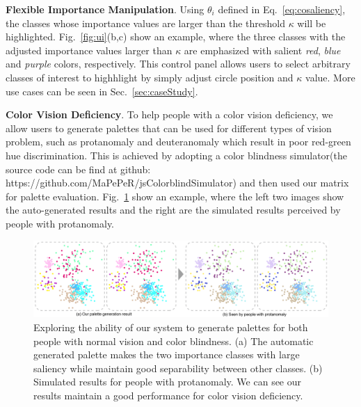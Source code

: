 \vspace{1.5mm}
\noindent\textbf{Flexible Importance Manipulation}.
Using $\theta_i$  defined in Eq.~\ref{eq:cosaliency}, the classes whose importance values are larger than the threshold $\kappa$ will be highlighted.
Fig.~\ref{fig:ui}(b,c) show an example, where the three classes with the adjusted importance values larger than $\kappa$ are emphasized with salient \emph{red}, \emph{blue} and \emph{purple} colors, respectively.
This control panel allows users to select arbitrary classes of interest to highhlight by simply adjust circle position and $\kappa$ value. More use cases can be seen in Sec.~\ref{sec:caseStudy}.

\vspace{1.5mm}
\noindent\textbf{Color Vision Deficiency}.
To help people with a color vision deficiency, we allow users to generate palettes that can be used for different types of vision problem, such as protanomaly and deuteranomaly which result in poor red-green hue discrimination. This is achieved by adopting a color blindness simulator(the source code can be find at github: https://github.com/MaPePeR/jsColorblindSimulator) and then used our matrix for palette evaluation. Fig.~\ref{fig:blindness} show an example, where the left two images show the auto-generated results and the right are the simulated results perceived by people with protanomaly.

\begin{figure}[ht]
\centering
\includegraphics[width=0.96\linewidth]{figures/blindness.pdf}
\caption{Exploring the ability of our system to generate palettes for both people with normal vision and color blindness. (a) The automatic generated palette makes the two importance classes with large saliency while maintain good separability between other classes. (b) Simulated results for people with protanomaly. We can see our results maintain a good performance for color vision deficiency.}
\vspace*{-3mm}
\label{fig:blindness}
\end{figure}

